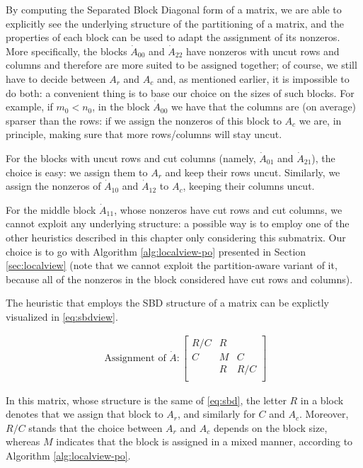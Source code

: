 By computing the Separated Block Diagonal form of a matrix, we are able to explicitly see the underlying structure of the partitioning of a matrix, and the properties of each block can be used to adapt the assignment of its nonzeros. More specifically, the blocks $\dot{A}_{00}$ and $\dot{A}_{22}$ have nonzeros with uncut rows and columns and therefore are more suited to be assigned together; of course, we still have to decide between $A_r$ and $A_c$ and, as mentioned earlier, it is impossible to do both: a convenient thing is to base our choice on the sizes of such blocks. For example, if $m_0 < n_0$, in the block $\dot{A}_{00}$ we have that the columns are (on average) sparser than the rows: if we assign the nonzeros of this block to $A_c$ we are, in principle, making sure that more rows/columns will stay uncut.

For the blocks with uncut rows and cut columns (namely, $\dot{A}_{01}$ and $\dot{A}_{21}$), the choice is easy: we assign them to $A_r$ and keep their rows uncut. Similarly, we assign the nonzeros of $\dot{A}_{10}$ and $\dot{A}_{12}$ to $A_c$, keeping their columns uncut. 

For the middle block $\dot{A}_{11}$, whose nonzeros have cut rows and cut columns, we cannot exploit any underlying structure: a possible way is to employ one of the other heuristics described in this chapter only considering this submatrix. Our choice is to go with Algorithm \ref{alg:localview-po} presented in Section \ref{sec:localview} (note that we cannot exploit the partition-aware variant of it, because all of the nonzeros in the block considered have cut rows and columns).

The heuristic that employs the SBD structure of a matrix can be explictly visualized in \eqref{eq:sbdview}.

\begin{align}
	\text{	Assignment of } \dot{A}:	\begin{bmatrix}
		R/C & R & \\
		C & M & C \\
		& R & R/C \\
	\end{bmatrix}
	\label{eq:sbdview}
\end{align}

In this matrix, whose structure is the same of \eqref{eq:sbd}, the letter $R$ in a block denotes that we assign that block to $A_r$, and similarly for $C$ and $A_c$. Moreover, $R/C$ stands that the choice between $A_r$ and $A_c$ depends on the block size, whereas $M$ indicates that the block is assigned in a mixed manner, according to Algorithm \ref{alg:localview-po}.

